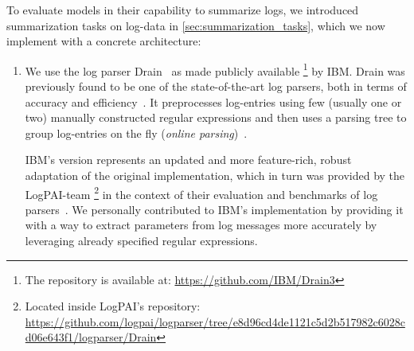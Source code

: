 To evaluate models in their capability to summarize logs,
we introduced summarization tasks on log-data in \autoref{sec:summarization_tasks},
which we now implement with a concrete architecture:
\begin{enumerate}
\item We use the log parser Drain~\parencite{drain} as made publicly available%
      \footnote{The repository is available at: \url{https://github.com/IBM/Drain3}}
      by IBM.
      Drain was previously found to be one of the state-of-the-art log parsers,
      both in terms of accuracy and efficiency~\parencite[125-128]{logpai_logparser_benchmarks}.
      It preprocesses log-entries using few (usually one or two) manually constructed
      regular expressions and then uses a parsing tree to group log-entries on the fly (\emph{online parsing})~\parencite{drain}.

      IBM's version represents an updated and more feature-rich,
      robust adaptation of the original implementation, which in turn was provided by the LogPAI-team%
      \footnote{Located inside LogPAI's repository: \url{https://github.com/logpai/logparser/tree/e8d96cd4de1121c5d2b517982c6028cd06e643f1/logparser/Drain}}
      in the context of their evaluation and benchmarks of log parsers~\parencites{logpai_logparser_evaluation}{logpai_logparser_benchmarks}.
      We personally contributed to IBM's implementation by providing it with a way to extract
      parameters from log messages more accurately by leveraging already specified regular expressions.


\end{enumerate}
